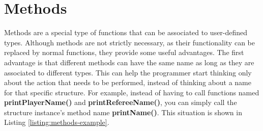 \documentclass[11pt,fleqn,openany]{book} %
\begin{document}


\section{Methods}


Methods are a special type of functions that can be associated to user-defined types. Although methods are not strictly necessary, as their functionality can be replaced by normal functions, they provide some useful advantages. The first advantage is that different methods can have the same name as long as they are associated to different types. This can help the programmer start thinking only about the action that needs to be performed, instead of thinking about a name for that specific structure. For example, instead of having to call functions named \textbf{printPlayerName()} and \textbf{printRefereeName()}, you can simply call the structure instance's method name \textbf{printName()}. This situation is shown in Listing \ref{listing:methods-example}.

\end{document}
